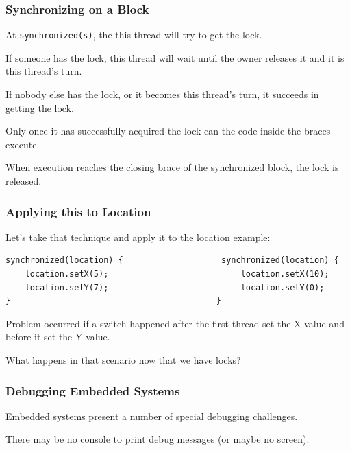 \begin{frame}
\frametitle{Synchronizing on a Block}
\begin{changemargin}{1cm}

At \texttt{synchronized(s)}, the this thread will try to get the lock. 

If someone has the lock, this thread will wait until the owner releases it and it is this thread's turn. 

If nobody else has the lock, or it becomes this thread's turn, it succeeds in getting the lock. 

Only once it has successfully acquired the lock can the code inside the braces execute. 

When execution reaches the closing brace of the synchronized block, the lock is released.


\end{changemargin}
\end{frame}

\begin{frame}[fragile]
\frametitle{Applying this to Location}
\begin{changemargin}{1cm}

Let's take that technique and apply it to the location example:

{\scriptsize
\begin{verbatim}
synchronized(location) {                    synchronized(location) {
    location.setX(5);                           location.setX(10);
    location.setY(7);                           location.setY(0);
}                                          }
\end{verbatim}
}

Problem occurred if a switch happened after the first thread set the X value and before it set the Y value. 

What happens in that scenario now that we have locks?

\end{changemargin}
\end{frame}


\begin{frame}
\frametitle{Debugging Embedded Systems}
\begin{changemargin}{1cm}

Embedded systems present a number of special debugging challenges.

There may be no console to print debug messages (or maybe no screen).


\end{changemargin}
\end{frame}

